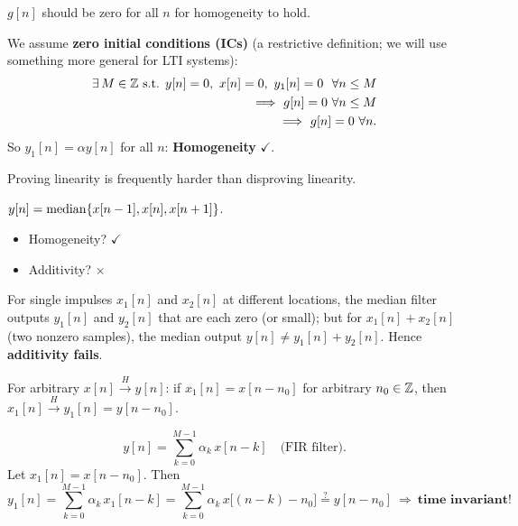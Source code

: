 \documentclass[handout_subfiles_root.tex]{subfiles}
\begin{document}
\begin{notebox}
$g[n]$ should be zero for all $n$ for homogeneity to hold.

We assume
\textbf{zero initial conditions (ICs)} (a restrictive definition; we will
use something more general for LTI systems):
\begin{align*}
\exists\, M\in\mathbb{Z} \text{ s.t. } y[n]=0,\ x[n]=0,\ y_1[n]=0 \ \ \forall n\le M \\
\Longrightarrow\ g[n]=0\ \forall n\le M \\
\Longrightarrow\ g[n]=0\ \forall n.
\end{align*}
\noindent{}So $y_1[n] = \alpha y[n]$ for all $n$: \textbf{Homogeneity} $\checkmark$.
\end{notebox}

\begin{notebox}
Proving linearity is frequently harder than disproving linearity.
\end{notebox}

\begin{examplebox}[title={Example (Median Filter: Homogeneous but not Additive)}]
$y[n] = \operatorname{median}\{x[n-1], x[n], x[n+1]\}$.
\begin{itemize}
  \item Homogeneity? $\checkmark$
  \item Additivity? $\times$
\end{itemize}
For single impulses $x_1[n]$ and $x_2[n]$ at different locations, the median
filter outputs $y_1[n]$ and $y_2[n]$ that are each zero (or small); but for
$x_1[n]+x_2[n]$ (two nonzero samples), the median output $y[n] \ne
y_1[n]+y_2[n]$. Hence \textbf{additivity fails}.
\end{examplebox}

\label{sec:time-invariance}

\begin{defbox}[title={Definition (Time-Invariance)}]
For arbitrary $x[n]\xrightarrow{H}y[n]$: if $x_1[n] = x[n-n_0]$ for arbitrary
$n_0\in\mathbb{Z}$, then $x_1[n]\xrightarrow{H}y_1[n] = y[n-n_0]$.
\end{defbox}

\begin{examplebox}[title={Example (FIR Filter is Time-Invariant)}]
$$y[n] = \sum_{k=0}^{M-1}\alpha_k\,x[n-k] \quad \text{(FIR filter)}.$$
Let $x_1[n] = x[n-n_0]$. Then
$$y_1[n] = \sum_{k=0}^{M-1}\alpha_k\,x_1[n-k]
         = \sum_{k=0}^{M-1}\alpha_k\,x\big[(n-k)-n_0\big]
         \overset{?}{=} y[n-n_0] \ \Longrightarrow\ \textbf{time invariant!}$$
\end{examplebox}
\end{document}
